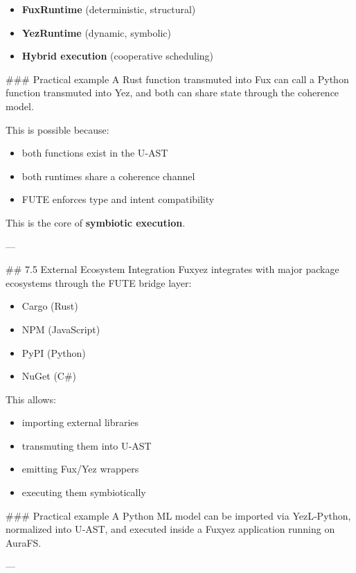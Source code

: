 \begin{itemize}
  \item \textbf{FuxRuntime} (deterministic, structural)  
  \item \textbf{YezRuntime} (dynamic, symbolic)  
  \item \textbf{Hybrid execution} (cooperative scheduling)  
\end{itemize}

\#\#\# Practical example  
A Rust function transmuted into Fux can call a Python function transmuted into Yez, and both can share state through the coherence model.

This is possible because:

\begin{itemize}
  \item both functions exist in the U‑AST  
  \item both runtimes share a coherence channel  
  \item FUTE enforces type and intent compatibility  
\end{itemize}

This is the core of \textbf{symbiotic execution}.

---

\#\# 7.5 External Ecosystem Integration  
Fuxyez integrates with major package ecosystems through the FUTE bridge layer:

\begin{itemize}
  \item Cargo (Rust)  
  \item NPM (JavaScript)  
  \item PyPI (Python)  
  \item NuGet (C\#)  
\end{itemize}

This allows:

\begin{itemize}
  \item importing external libraries  
  \item transmuting them into U‑AST  
  \item emitting Fux/Yez wrappers  
  \item executing them symbiotically  
\end{itemize}

\#\#\# Practical example  
A Python ML model can be imported via YezL‑Python, normalized into U‑AST, and executed inside a Fuxyez application running on AuraFS.

---

